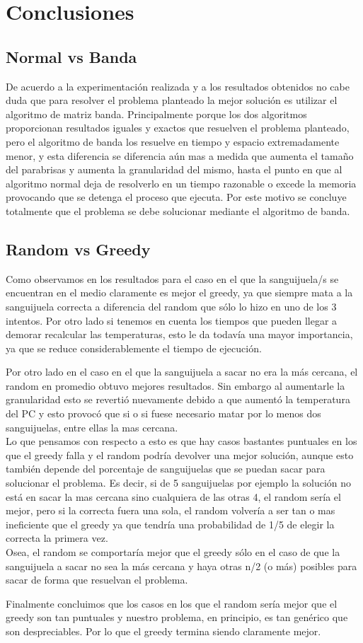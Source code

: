 \section{Conclusiones}

\subsection{Normal vs Banda}

De acuerdo a la experimentación realizada y a los resultados obtenidos no cabe duda que para resolver el problema planteado la mejor solución es utilizar el algoritmo de matriz banda. Principalmente porque los dos algoritmos proporcionan resultados iguales y exactos que resuelven el problema planteado, pero el algoritmo de banda los resuelve en tiempo y espacio extremadamente menor, y esta diferencia se diferencia aún mas a medida que aumenta el tamaño del parabrisas y aumenta la granularidad del mismo, hasta el punto en que al algoritmo normal deja de resolverlo en un tiempo razonable o excede la memoria provocando que se detenga el proceso que ejecuta. Por este motivo se concluye totalmente que el problema se debe solucionar mediante el algoritmo de banda.

\subsection{Random vs Greedy}

Como observamos en los resultados para el caso en el que la sanguijuela/s se encuentran en el medio claramente es mejor el greedy, ya que siempre mata a la sanguijuela correcta a diferencia del random que sólo lo hizo en uno de los 3 intentos. Por otro lado si tenemos en cuenta los tiempos que pueden llegar a demorar recalcular las temperaturas, esto le da todavía una mayor importancia, ya que se reduce considerablemente el tiempo de ejecución.

Por otro lado en el caso en el que la sanguijuela a sacar no era la más cercana, el random en promedio obtuvo mejores resultados. Sin embargo al aumentarle la granularidad esto se revertió nuevamente debido a que aumentó la temperatura del PC y esto provocó que si o si fuese necesario matar por lo menos dos sanguijuelas, entre ellas la mas cercana. \\
Lo que pensamos con respecto a esto es que hay casos bastantes puntuales en los que el greedy falla y el random podría devolver una mejor solución, aunque esto también depende del porcentaje de sanguijuelas que se puedan sacar para solucionar el problema. Es decir, si de 5 sanguijuelas por ejemplo la solución no está en sacar la mas cercana sino cualquiera de las otras 4, el random sería el mejor, pero si la correcta fuera una sola, el random volvería a ser tan o mas ineficiente que el greedy ya que tendría una probabilidad de 1/5 de elegir la correcta la primera vez.\\
Osea, el random se comportaría mejor que el greedy sólo en el caso de que la sanguijuela a sacar no sea la más cercana y haya otras n/2 (o más) posibles para sacar de forma que resuelvan el problema.

Finalmente concluimos que los casos en los que el random sería mejor que el greedy son tan puntuales y nuestro problema, en principio, es tan genérico que son despreciables. Por lo que el greedy termina siendo claramente mejor.






